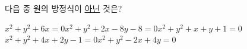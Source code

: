 다음 중 원의 방정식이 \underline{아닌} 것은?
\begin{choicesii}{$x^2+y^2+6x=0$}{$x^2+y^2+2x-8y-8=0$}{$x^2+y^2+x+y+1=0$}{$x^2+y^2+4x+2y-1=0$}{$x^2+y^2-2x+4y=0$}\end{choicesii}
